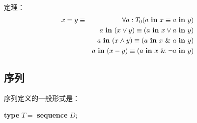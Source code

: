 \documentclass[twoside,11pt,fontset=none]{ctexbook}
\begin{document}
\noindent
定理：
\begin{eqnarray*}
	x = y &\equiv& \forall a:T_0(a \text{ \textbf{in} } x \equiv a \text{ \textbf{in} } y)\\
	&&a \text{ \textbf{in} } (x \lor y) \equiv (a \text{ \textbf{in} } x \lor a \text{ \textbf{in} } y) \\
	&&a \text{ \textbf{in} } (x \land y) \equiv (a \text{ \textbf{in} } x\ \&\ a \text{ \textbf{in} } y) \\
	&&a \text{ \textbf{in} } (x - y) \equiv (a \text{ \textbf{in} } x\ \&\ \neg a \text{ \textbf{in} } y) \\
\end{eqnarray*}

\subsection{序列}

序列定义的一般形式是：

\quad \textbf{type} $T =$ \textbf{sequence} $D$;
\end{document}
